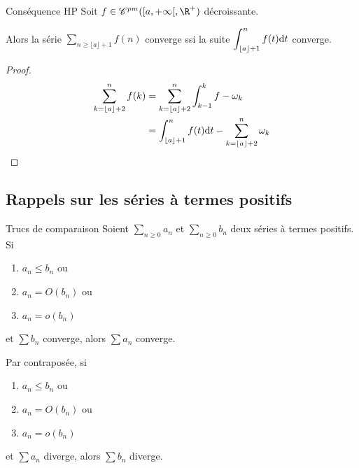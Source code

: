 \begin{proposition}{Conséquence HP }{}
    Soit $f \in \mathscr C^{pm}([a, + \infty[, \R^+)$ décroissante. 

    Alors la série $\displaystyle \sum_{n \geqslant \lfloor a \rfloor + 1} f(n)$ converge ssi la suite 
    $\displaystyle \int_{\lfloor a \rfloor + 1 }^{n } f(t) \text d t$ converge.
\end{proposition}

\begin{proof}
    \begin{align*}
        \sum_{k = \lfloor a \rfloor + 2}^{n} f(k) & = \sum_{k = \lfloor a \rfloor + 2}^{n} \int_{k - 1 }^{k} f- \omega_k \\
                                                    & = \int_{\lfloor a \rfloor + 1}^{n} f(t) \text d t - \sum_{k = \lfloor a \rfloor + 2}^{n} \omega_k                                 
    \end{align*}

\end{proof}

\subsection{Rappels sur les séries à termes positifs }

\begin{theoreme}{Trucs de comparaison }{}
    Soient $\sum_{n \geqslant 0 } a_n$ et $\sum_{n \geqslant 0} b_n$ deux séries à termes positifs. Si 
    
    \begin{enumerate}
        \item $a_n \leqslant b_n$ ou
        \item $a_n = O(b_n)$ ou
        \item $a_n = o(b_n)$ 
    \end{enumerate}

    et $\sum b_n$ converge, alors $\sum a_n$ converge.

    Par contraposée, si 
    \begin{enumerate}
        \item $a_n \leqslant b_n$ ou
        \item $a_n = O(b_n)$ ou
        \item $a_n = o(b_n)$ 
    \end{enumerate}
    et $\sum a_n$ diverge, alors $\sum b_n$ diverge. 
\end{theoreme}

